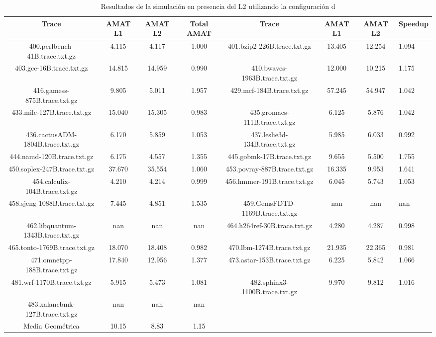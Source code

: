 \begin{table}[H]
\centering
\begin{tabular}{|c|c|c|c|c|c|c|}
\hline
Trace & AMAT L1 & AMAT L2 & Total AMAT & Trace & AMAT L1 & AMAT L2 & Speedup \\
\hline
400.perlbench-41B.trace.txt.gz & 4.115 & 4.117 & 1.000 & 401.bzip2-226B.trace.txt.gz & 13.405 & 12.254 & 1.094 \\\hline
403.gcc-16B.trace.txt.gz & 14.815 & 14.959 & 0.990 & 410.bwaves-1963B.trace.txt.gz & 12.000 & 10.215 & 1.175 \\\hline
416.gamess-875B.trace.txt.gz & 9.805 & 5.011 & 1.957 & 429.mcf-184B.trace.txt.gz & 57.245 & 54.947 & 1.042 \\\hline
433.milc-127B.trace.txt.gz & 15.040 & 15.305 & 0.983 & 435.gromacs-111B.trace.txt.gz & 6.125 & 5.876 & 1.042 \\\hline
436.cactusADM-1804B.trace.txt.gz & 6.170 & 5.859 & 1.053 & 437.leslie3d-134B.trace.txt.gz & 5.985 & 6.033 & 0.992 \\\hline
444.namd-120B.trace.txt.gz & 6.175 & 4.557 & 1.355 & 445.gobmk-17B.trace.txt.gz & 9.655 & 5.500 & 1.755 \\\hline
450.soplex-247B.trace.txt.gz & 37.670 & 35.554 & 1.060 & 453.povray-887B.trace.txt.gz & 16.335 & 9.953 & 1.641 \\\hline
454.calculix-104B.trace.txt.gz & 4.210 & 4.214 & 0.999 & 456.hmmer-191B.trace.txt.gz & 6.045 & 5.743 & 1.053 \\\hline
458.sjeng-1088B.trace.txt.gz & 7.445 & 4.851 & 1.535 & 459.GemsFDTD-1169B.trace.txt.gz & nan & nan & nan \\\hline
462.libquantum-1343B.trace.txt.gz & nan & nan & nan & 464.h264ref-30B.trace.txt.gz & 4.280 & 4.287 & 0.998 \\\hline
465.tonto-1769B.trace.txt.gz & 18.070 & 18.408 & 0.982 & 470.lbm-1274B.trace.txt.gz & 21.935 & 22.365 & 0.981 \\\hline
471.omnetpp-188B.trace.txt.gz & 17.840 & 12.956 & 1.377 & 473.astar-153B.trace.txt.gz & 6.225 & 5.842 & 1.066 \\\hline
481.wrf-1170B.trace.txt.gz & 5.915 & 5.473 & 1.081 & 482.sphinx3-1100B.trace.txt.gz & 9.970 & 9.812 & 1.016 \\\hline
483.xalancbmk-127B.trace.txt.gz & nan & nan & nan &  &  &  &  \\\hline
Media Geométrica & 10.15 & 8.83&1.15 & & & &\\\hline
\end{tabular}
\caption{Resultados de la simulación en presencia del L2 utilizando la configuración d}
\label{tab:amatL1}
\end{table}